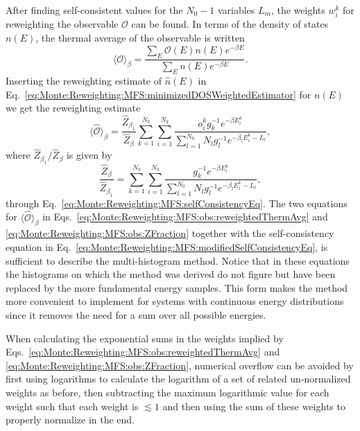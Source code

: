 After finding self-consistent values for the $N_0-1$ variables $L_m$, the weights $w_i^k$ for reweighting the observable $\mathcal{O}$ can be found. In terms of the
density of states $n(E)$, the thermal average of the observable is written
\begin{equation}
    \label{eq:Monte:Reweighting:MFS:obs:thermAvg}
    \langle\mathcal{O}\rangle_\beta = \frac{\sum_E\mathcal{O}(E)n(E)e^{-\beta E}}{\sum_En(E)e^{-\beta E}}.
\end{equation}
Inserting the reweighting estimate of $\hat{n}(E)$ in Eq.~\eqref{eq:Monte:Reweighting:MFS:minimizedDOSWeightedEstimator} for $n(E)$ we get the reweighting estimate
\begin{equation}
    \label{eq:Monte:Reweighting:MFS:obs:reweightedThermAvg}
    \langle\hat{\mathcal{O}}\rangle_\beta = \frac{\hat{Z}_{\beta_1}}{\hat{Z}_\beta}\sum_{k=1}^{N_0}\sum_{i=1}^{N_k}\frac{o_i^kg_k^{-1}e^{-\beta E_i^k}}{\sum_{l=1}^{N_0}N_lg_l^{-1}e^{-\beta_lE_i^k-L_l}},
\end{equation}
where $\hat{Z}_{\beta_1}/\hat{Z}_\beta$ is given by
\begin{equation}
    \label{eq:Monte:Reweighting:MFS:obs:ZFraction}
    \frac{\hat{Z}_\beta}{\hat{Z}_{\beta_1}} = \sum_{k=1}^{N_0}\sum_{i=1}^{N_k}\frac{g_k^{-1}e^{-\beta E_i^k}}{\sum_{l=1}^{N_0}N_lg_l^{-1}e^{-\beta_lE_i^k - L_l}},
\end{equation}
through Eq.~\eqref{eq:Monte:Reweighting:MFS:selfConsistencyEq}. The two equations for $\langle\hat{\mathcal{O}}\rangle_\beta$ in
Eqs.~\eqref{eq:Monte:Reweighting:MFS:obs:reweightedThermAvg} and \eqref{eq:Monte:Reweighting:MFS:obs:ZFraction} together with the self-consistency equation in
Eq.~\eqref{eq:Monte:Reweighting:MFS:modifiedSelfConsistencyEq}, is sufficient to describe the multi-histogram method. Notice that in these equations the
histograms on which the method was derived do not figure but have been replaced by the more fundamental energy samples. This form makes the method more convenient
to implement for systems with continuous energy distributions since it removes the need for a sum over all possible energies.

When calculating the exponential sums in the weights implied by
Eqs.~\eqref{eq:Monte:Reweighting:MFS:obs:reweightedThermAvg} and \eqref{eq:Monte:Reweighting:MFS:obs:ZFraction}, numerical overflow can be avoided by first using
logarithms to calculate the logarithm of a set of related un-normalized weights as before, then subtracting the maximum logarithmic value for each weight such that
each weight is $\lesssim1$ and then using the sum of these weights to properly normalize in the end.

